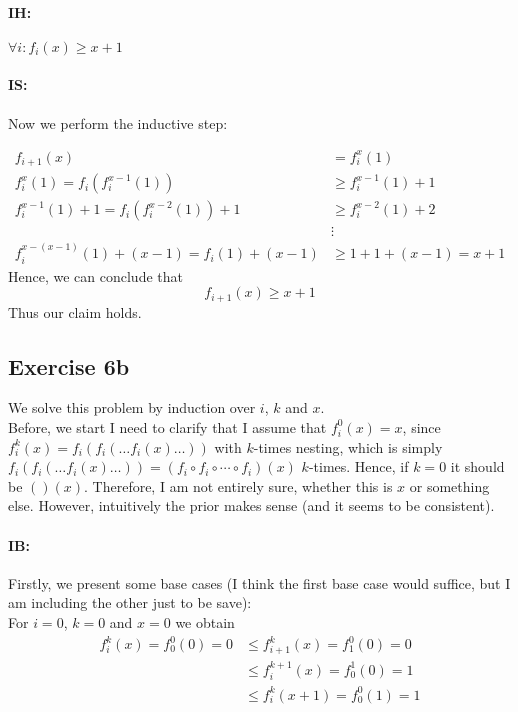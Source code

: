 \documentclass[11pt,a4paper]{article}
\begin{document}
\paragraph{IH:} $\forall i: f_i(x) \geq x+1$

\paragraph{IS:} Now we perform the inductive step:

\begin{equation*}
\begin{split}
f_{i+1}(x) & =  f_i^x(1) \\
f_i^x(1) =  f_i(f_i^{x-1}(1))  & \geq   f_i^{x-1}(1) + 1 \\
f_i^{x-1}(1) + 1 =  f_i(f_i^{x-2}(1)) +1   & \geq   f_i^{x-2}(1) + 2 \\
& \vdots \\
f_i^{x-(x-1)}(1) + (x-1) =  f_i(1) + (x-1)   & \geq   1+ 1 + (x-1) = x + 1
\end{split}
\end{equation*}
Hence, we can conclude that 
\begin{equation*}
f_{i+1}(x)  \geq x + 1
\end{equation*}
Thus our claim holds.

\subsection*{Exercise 6b}

We solve this problem by induction over $i$, $k$ and $x$. \\
Before, we start I need to clarify that I assume that $f_i^0(x)=x$, since $f_i^k(x) = f_i(f_i( \dots f_i(x) \dots))$ with $k$-times nesting,
which is simply $f_i(f_i( \dots f_i(x) \dots))=(f_i \circ f_i \circ \cdots \circ f_i)(x)$ $k$-times. Hence, if $k=0$ it should be $()(x)$.
Therefore, I am not entirely sure, whether this is $x$ or something else. However, intuitively the prior makes sense (and it seems to be 
consistent).

\paragraph{IB:} Firstly, we present some base cases (I think the first base case would suffice, but I am including the other just to be save): \\
For $i=0$, $k=0$ and $x=0$ we obtain
\begin{equation*}
\begin{split}
f_i^k(x) = f_0^0(0) = 0 
& \leq f_{i+1}^k(x) =  f_1^0(0) = 0 \\
& \leq f_i^{k+1}(x) =  f_0^1(0) = 1 \\
& \leq f_i^k(x+1) =  f_0^0(1) = 1 \\
\end{split}
\end{equation*}
\end{document}
